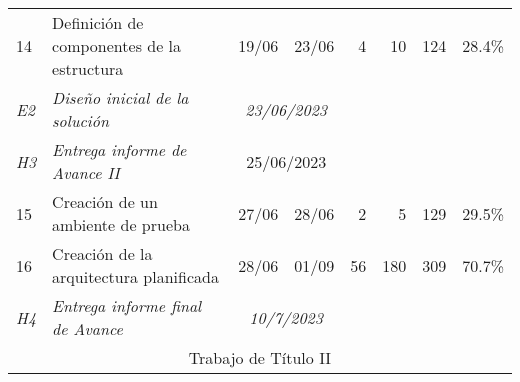 \begin{longtable}[c]{llccrrrr}
	{\color[HTML]{656565} 14}              & {\color[HTML]{656565} Definición de componentes de la estructura}      & \multicolumn{1}{l}{{\color[HTML]{656565} 19/06}} & \multicolumn{1}{l}{{\color[HTML]{656565} 23/06}} & {\color[HTML]{656565} 4}          & {\color[HTML]{656565} 10}          & {\color[HTML]{656565} 124}           & {\color[HTML]{656565} 28.4\%}       \\
	\textit{E2}                            & \textit{Diseño inicial de la solución}                                 & \multicolumn{2}{c}{\textit{23/06/2023}}          & \textit{}                                        & \textit{}                         & \textit{}                          & \textit{}                                                                  \\
	\textit{H3}                            & \textit{Entrega informe de Avance II}                                  & \multicolumn{2}{c}{25/06/2023}                   &                                                  &                                   &                                    &                                                                            \\
	{\color[HTML]{656565} 15}              & {\color[HTML]{656565} Creación de un ambiente de prueba}               & \multicolumn{1}{l}{{\color[HTML]{656565} 27/06}} & \multicolumn{1}{l}{{\color[HTML]{656565} 28/06}} & {\color[HTML]{656565} 2}          & {\color[HTML]{656565} 5}           & {\color[HTML]{656565} 129}           & {\color[HTML]{656565} 29.5\%}       \\
	{\color[HTML]{656565} 16}              & {\color[HTML]{656565} Creación de la arquitectura planificada}         & \multicolumn{1}{l}{{\color[HTML]{656565} 28/06}} & \multicolumn{1}{l}{{\color[HTML]{656565} 01/09}} & {\color[HTML]{656565} 56}         & {\color[HTML]{656565} 180}         & {\color[HTML]{656565} 309}           & {\color[HTML]{656565} 70.7\%}       \\
	\textit{H4}                            & \textit{Entrega informe final de Avance}                               & \multicolumn{2}{c}{\textit{10/7/2023}}           & \textit{}                                        & \textit{}                         & \textit{}                          & \textit{}                                                                  \\ \hline
	\multicolumn{8}{c}{Trabajo de Título II}                                                                                                                                                                                                                                                                                                                                    \\ \hline

\end{longtable}
